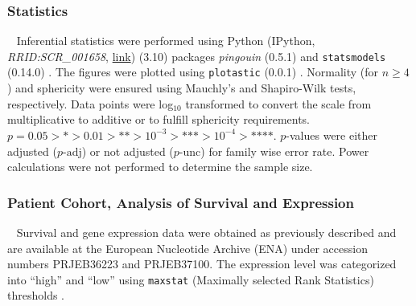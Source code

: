 \subsubsection*{Statistics}
\ %
Inferential statistics were performed using Python (IPython,
\textit{RRID:SCR\_001658},
\href{https://www.ncbi.nlm.nih.gov/sra?term=SCR_001658}{link}) (3.10) packages
\textit{pingouin} (0.5.1) and \texttt{statsmodels} (0.14.0)
\cite{vallatPingouinStatisticsPython2018,seaboldStatsmodelsEconometricStatistical2010}.
The figures were plotted using \texttt{plotastic} (0.0.1)
\cite{kuricPlotasticBridgingPlotting2024}. Normality (for \( n \geq 4 \)) and
sphericity were ensured using Mauchly’s and Shapiro-Wilk tests, respectively.
Data points were log\(_{10}\) transformed to convert the scale from
multiplicative to additive or to fulfill sphericity requirements. \( p = 0.05 >
\text{*} > 0.01 > \text{**} > 10^{-3} > \text{***}> 10^{-4} > \text{****} \).
$p$-values were either adjusted (\( p{\text{-adj}} \)) or not adjusted (\(
p{\text{-unc}} \)) for family wise error rate. Power calculations were not
performed to determine the sample size.



\subsubsection*{Patient Cohort, Analysis of Survival and Expression}
\ %
Survival and gene expression data were obtained as previously described
\cite{seckingerTargetExpressionGeneration2017b,seckingerCD38ImmunotherapeuticTarget2018}
and are available at the European Nucleotide Archive (ENA) under accession
numbers PRJEB36223 and PRJEB37100. The expression level was categorized into
``high'' and ``low'' using \texttt{maxstat} (Maximally selected Rank Statistics)
thresholds \cite{hothornMaximallySelectedRank}.

